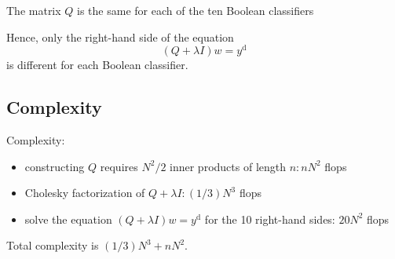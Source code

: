 The matrix $ Q $ is the same for each of the ten Boolean classifiers

Hence, only the right-hand side of the equation
\begin{equation}
(Q+\lambda I) w=y^{\mathrm{d}}
\end{equation}
is different for each Boolean classifier.

\subsection{Complexity}

Complexity:

\begin{itemize}
    \item constructing $ Q $ requires $ N^{2} / 2 $ inner products of length $ n: n N^{2} $ flops
    \item Cholesky factorization of $ Q+\lambda I:(1 / 3) N^{3} $ flops
    \item solve the equation $ (Q+\lambda I) w=y^{\mathrm{d}} $ for the 10 right-hand sides: $ 20 N^{2} $ flops
\end{itemize}

Total complexity is $ (1 / 3) N^{3}+n N^{2} $.

